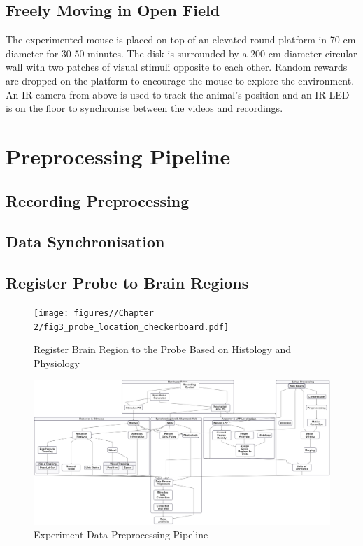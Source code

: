 \subsection{Freely Moving in Open Field}
The experimented mouse is placed on top of an elevated round platform in 70 cm diameter for 30-50 minutes. The disk is surrounded by a 200 cm diameter circular wall with two patches of visual stimuli opposite to each other. Random rewards are dropped on the platform to encourage the mouse to explore the environment. An IR camera from above is used to track the animal's position and an IR LED is on the floor to synchronise between the videos and recordings.



\section{Preprocessing Pipeline}
\subsection{Recording Preprocessing}


\subsection{Data Synchronisation}


\subsection{Register Probe to Brain Regions}
\begin{figure}
    \centering
    \texttt{[image: figures//Chapter 2/fig3\_probe\_location\_checkerboard.pdf]}
    \caption{Register Brain Region to the Probe Based on Histology and Physiology}
    \label{fig:placeholder}
\end{figure}


\begin{figure}
    \centering
    \includegraphics[width=1\linewidth]{figures//Chapter 2//plots/flow_chart_td.png}
    \caption{Experiment Data Preprocessing Pipeline}
    \label{fig:placeholder}
\end{figure}





